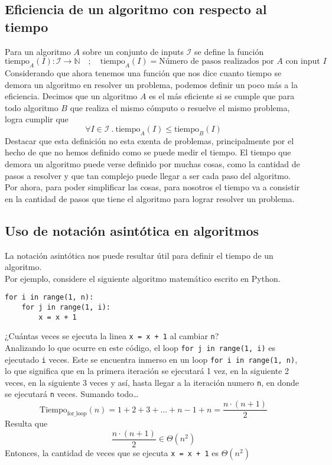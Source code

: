 \documentclass[../main.tex]{subfiles}
\begin{document}
\subsection{Eficiencia de un algoritmo con respecto al tiempo}
Para un algoritmo $A$ sobre un conjunto de inputs $\mathcal{I}$ se define la función
\[ \text{tiempo}_A(I) : \mathcal{I} \rightarrow \mathds{N} \quad ; \quad \text{tiempo}_A(I) = \text{Número de pasos realizados por $A$ con input $I$} \]
Considerando que ahora tenemos una función que nos dice cuanto tiempo se demora un algoritmo en resolver un problema, podemos definir un poco más a la eficiencia. Decimos que un algoritmo $A$ es el más eficiente si se cumple que para todo algoritmo $B$ que realiza el mismo cómputo o resuelve el mismo problema, logra cumplir que
\[ \forall I \in \mathcal{I}\ .\ \text{tiempo}_A(I) \leq \text{tiempo}_B(I) \]
Destacar que esta definición no esta exenta de problemas, principalmente por el hecho de que no hemos definido como se puede medir el tiempo. El tiempo que demora un algoritmo puede verse definido por muchas cosas, como la cantidad de pasos a resolver y que tan complejo puede llegar a ser cada paso del algoritmo. Por ahora, para poder simplificar las cosas, para nosotros el tiempo va a consistir en la cantidad de pasos que tiene el algoritmo para lograr resolver un problema.

\subsection{Uso de notación asintótica en algoritmos}
La notación asintótica nos puede resultar útil para definir el tiempo de un algoritmo.\\
Por ejemplo, considere el siguiente algoritmo matemático escrito en Python.
\begin{verbatim}
for i in range(1, n):
    for j in range(1, i):
        x = x + 1
\end{verbatim}
¿Cuántas veces se ejecuta la linea \texttt{x = x + 1} al cambiar \texttt{n}?\\
Analizando lo que ocurre en este código, el loop \texttt{for j in range(1, i)} es ejecutado \texttt{i} veces. Este se encuentra inmerso en un loop \texttt{for i in range(1, n)}, lo que significa que en la primera iteración se ejecutará 1 vez, en la siguiente 2 veces, en la siguiente 3 veces y así, hasta llegar a la iteración numero \texttt{n}, en donde se ejecutará \texttt{n} veces. Sumando todo\dots
\[ \text{Tiempo}_{\text{for\_loop}}(n) = 1 + 2 + 3 + \ldots + n - 1 + n = \frac{n \cdot (n + 1)}{2} \]
Resulta que
\[\frac{n \cdot (n + 1)}{2} \in \Theta(n^2) \]
Entonces, la cantidad de veces que se ejecuta \texttt{x = x + 1} es $\Theta(n^2)$
\end{document}
